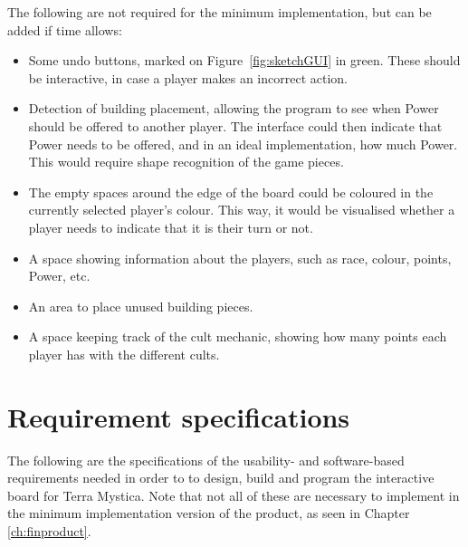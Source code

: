 The following are not required for the minimum implementation, but can be added if time allows:
\begin{itemize}
\item Some undo buttons, marked on Figure~\ref{fig:sketchGUI} in green. These should be interactive, in case a player makes an incorrect action.
\item Detection of building placement, allowing the program to see when Power should be offered to another player. The interface could then indicate that Power needs to be offered, and in an ideal implementation, how much Power. This would require shape recognition of the game pieces.
\item The empty spaces around the edge of the board could be coloured in the currently selected player's colour. This way, it would be visualised whether a player needs to indicate that it is their turn or not.
\item A space showing information about the players, such as race, colour, points, Power, etc.
\item An area to place unused building pieces.
\item A space keeping track of the cult mechanic, showing how many points each player has with the different cults.
\end{itemize}

\section{Requirement specifications}\label{sec:ReqSpec}
The following are the specifications of the usability- and software-based requirements needed in order to to design, build and program the interactive board for Terra Mystica. Note that not all of these are necessary to implement in the minimum implementation version of the product, as seen in Chapter \ref{ch:finproduct}.

